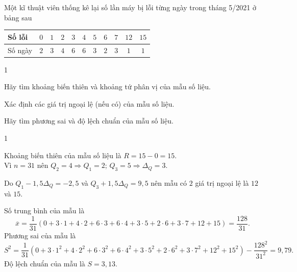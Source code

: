 \begin{bt}%
	Một kĩ thuật viên thống kê lại số lần máy bị lỗi từng ngày trong tháng 5/2021 ở bảng sau
	\begin{center}
		\begin{tabular}{|l|c|c|c|c|c|c|c|c|c|c|}
			\hline Số lỗi & $0$ & $1$ & $2$ & $3$ & $4$ & $5$ &$ 6$ & $7$ & $12$ & $15$ \\
			\hline Số ngày & $2$ & $3$ & $4$ & $6$ & $6$ & $3$ &$ 2$ & $3$ & $1$ & $1 $\\
			\hline
		\end{tabular}
	\end{center}
	\begin{enumEX}[a)]{1}
		\item Hãy tìm khoảng biến thiên và khoảng tứ phân vị của mẫu số liệu.
		\item Xác định các giá trị ngoại lệ (nếu có) của mẫu số liệu.
		\item Hãy tìm phương sai và độ lệch chuẩn của mẫu số liệu.
	\end{enumEX}
	\loigiai
	{
		\begin{enumEX}[a)]{1}
			\item Khoảng biến thiên của mẫu số liệu là $R=15-0=15$.\\
			Vì $n=31$ nên $Q_2=4\Rightarrow Q_1=2;\, Q_3=5\Rightarrow \Delta_Q=3$.\\
			\item Do $Q_1-1{,}5 \Delta_Q=-2{,}5$ và $Q_3+1{,}5 \Delta_Q=9{,}5$ nên mẫu có $2$ giá trị ngoại lệ là $12$ và $15$.
			\item Số trung bình của mẫu là $$\overline{x}=\dfrac{1}{31}\left(0+3\cdot 1+4\cdot 2+6\cdot 3+6\cdot 4+3\cdot 5+2\cdot 6+3\cdot 7+12+15\right)=\dfrac{128}{31}.$$
			Phương sai của mẫu là $$S^2=\dfrac{1}{31}\left(0+3\cdot 1^2+4\cdot 2^2+6\cdot 3^2+6\cdot 4^2+3\cdot 5^2+2\cdot 6^2+3\cdot 7^2+12^2+15^2\right)-\dfrac{128^2}{31^2}=9{,}79.$$
			Độ lệch chuẩn của mẫu là $S=3{,}13$.
		\end{enumEX}
	}
\end{bt}

